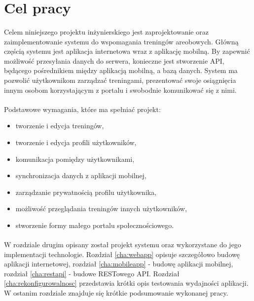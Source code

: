 \section{Cel pracy}
\label{sec:cel_pracy}
\paragraph{}
Celem niniejszego projektu inżynierskiego jest zaprojektowanie oraz zaimplementowanie systemu do wspomagania treningów areobowych. Główną częścią systemu jest aplikacja internetowa wraz z aplikację mobilną. By zapewnić możliwość przesyłania danych do serwera, konieczne jest stworzenie API, będącego pośrednikiem między aplikacją mobilną, a bazą danych.
System ma pozwolić użytkownikom zarządzać treningami, prezentować swoje osiągnięcia innym osobom korzystającym z portalu i swobodnie komunikować się z nimi.
\paragraph{} %
\label{par:}
Podstawowe wymagania, które ma spełniać projekt:
\begin{itemize}
	\item tworzenie i edycja treningów,
	\item tworzenie i edycja profili użytkowników,
	\item komunikacja pomiędzy użytkownikami,
	\item synchronizacja danych z aplikacji mobilnej,
	\item zarządzanie prywatnością profilu użytkownika,
	\item możliwość przeglądania treningów innych użytkowników,
	\item stworzenie formy małego portalu społecznościowego.
\end{itemize}

\paragraph{} %
W rozdziale drugim opisany został projekt systemu oraz wykorzystane do jego implementacji technologie. Rozdział \ref{cha:webapp} opisuje szczegółowo budowę aplikacji internetowej, rozdział \ref{cha:mobileapp} - budowę aplikacji mobilnej, rozdział \ref{cha:restapi} - budowe RESTowego API. Rozdział \ref{cha:rekonfigurowalnosc} przedstawia krótki opis testowania wydajności aplikacji. W ostanim rozdziale znajduje się krótkie podsumowanie wykonanej pracy.

